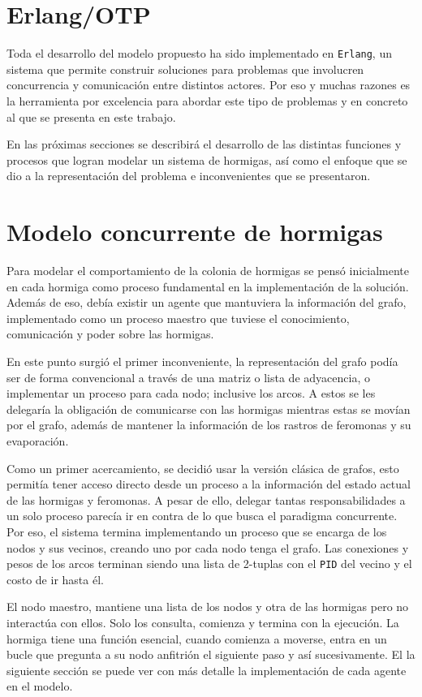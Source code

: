 \documentclass[
12pt, %
letterpaper, %
oneside, %
headinclude,footinclude, %
BCOR5mm, %
]{scrartcl}
\begin{document}
\section{Erlang/OTP}

Toda el desarrollo del modelo propuesto ha sido implementado en \texttt{Erlang}, un sistema que permite construir soluciones para problemas que involucren concurrencia y comunicación entre distintos actores. Por eso y muchas razones es la herramienta por excelencia para abordar este tipo de problemas y en concreto al que se presenta en este trabajo.

En las próximas secciones se describirá el desarrollo de las distintas funciones y procesos que logran modelar un sistema de hormigas, así como el enfoque que se dio a la representación del problema e inconvenientes que se presentaron.

\section{Modelo concurrente de hormigas}

Para modelar el comportamiento de la colonia de hormigas se pensó inicialmente en cada hormiga como proceso fundamental en la implementación de la solución. Además de eso, debía existir un agente que mantuviera la información del grafo, implementado como un proceso maestro que tuviese el conocimiento, comunicación y poder sobre las hormigas.

En este punto surgió el primer inconveniente, la representación del grafo podía ser de forma convencional a través de una matriz o lista de adyacencia, o implementar un proceso para cada nodo; inclusive los arcos. A estos se les delegaría la obligación de comunicarse con las hormigas mientras estas se movían por el grafo, además de mantener la información de los rastros de feromonas y su evaporación.

Como un primer acercamiento, se decidió usar la versión clásica de grafos, esto permitía tener acceso directo desde un proceso a la información del estado actual de las hormigas y feromonas. A pesar de ello, delegar tantas responsabilidades a un solo proceso parecía ir en contra de lo que busca el paradigma concurrente. Por eso, el sistema termina implementando un proceso que se encarga de los nodos y sus vecinos, creando uno por cada nodo tenga el grafo. Las conexiones y pesos de los arcos terminan siendo una lista de 2-tuplas con el \texttt{PID} del vecino y el costo de ir hasta él.

El nodo maestro, mantiene una lista de los nodos y otra de las hormigas pero no interactúa con ellos. Solo los consulta, comienza y termina con la ejecución. La hormiga tiene una función esencial, cuando comienza a moverse, entra en un bucle que pregunta a su nodo anfitrión el siguiente paso y así sucesivamente. El la siguiente sección se puede ver con más detalle la implementación de cada agente en el modelo.
\end{document}
